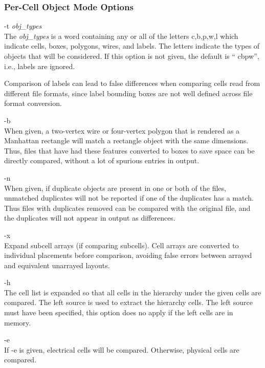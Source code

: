 \subsubsection{Per-Cell Object Mode Options}

\begin{description}
\item{{\vt -t} {\it obj\_types}}\\
The {\it obj\_types} is a word containing any or all of the letters
{\vt c,b,p,w,l} which indicate cells, boxes, polygons, wires, and
labels.  The letters indicate the types of objects that will be
considered.  If this option is not given, the default is ``{\vt
cbpw}'', i.e., labels are ignored.

Comparison of labels can lead to false differences when comparing
cells read from different file formats, since label bounding boxes are
not well defined across file format conversion.

\item{\vt -b}\\
When given, a two-vertex wire or four-vertex polygon that is rendered
as a Manhattan rectangle will match a rectangle object with the same
dimensions.  Thus, files that have had these features converted to
boxes to save space can be directly compared, without a lot of
spurious entries in output.
       
\item{\vt -n}\\
When given, if duplicate objects are present in one or both of the
files, unmatched duplicates will not be reported if one of the
duplicates has a match.  Thus files with duplicates removed can be
compared with the original file, and the duplicates will not appear in
output as differences.

\item{\vt -x}\\
Expand subcell arrays (if comparing subcells).  Cell arrays are
converted to individual placements before comparison, avoiding false
errors between arrayed and equivalent unarrayed layouts.

\item{\vt -h}\\
The cell list is expanded so that all cells in the hierarchy under the
given cells are compared.  The left source is used to extract the
hierarchy cells.  The left source must have been specified, this
option does no apply if the left cells are in memory.

\item{\vt -e}\\
If {\vt -e} is given, electrical cells will be compared.  Otherwise,
physical cells are compared.
\end{description}

